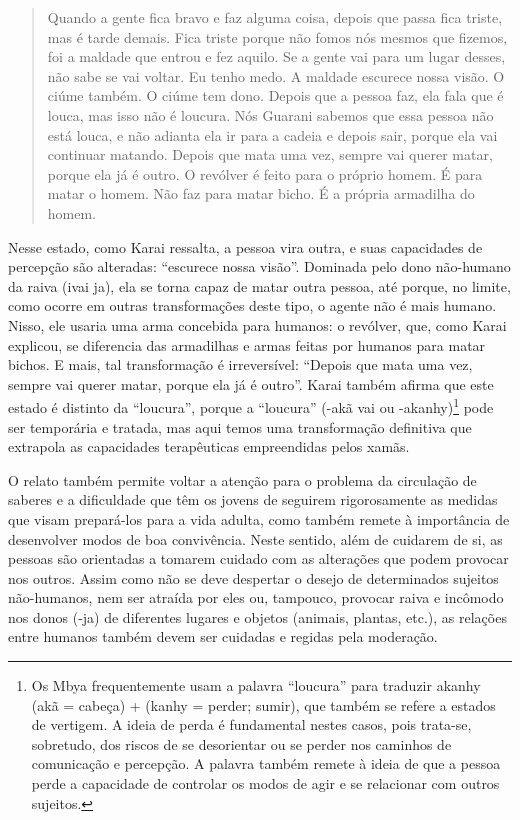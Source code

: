 \begin{quotation}
\noindent
Quando a gente fica bravo e faz alguma coisa, depois que passa fica
triste, mas é tarde demais. Fica triste porque não fomos nós mesmos que
fizemos, foi a maldade que entrou e fez aquilo. Se a gente vai para um
lugar desses, não sabe se vai voltar. Eu tenho medo. A maldade escurece
nossa visão. O ciúme também. O ciúme tem dono. Depois que a pessoa faz,
ela fala que é louca, mas isso não é loucura. Nós Guarani sabemos que
essa pessoa não está louca, e não adianta ela ir para a cadeia e depois
sair, porque ela vai continuar matando. Depois que mata uma vez, sempre
vai querer matar, porque ela já é outro. O revólver é feito para o
próprio homem. É para matar o homem. Não faz para matar bicho. É a
própria armadilha do homem.

\end{quotation}
Nesse estado, como Karai ressalta, a pessoa vira outra, e suas
capacidades de percepção são alteradas: ``escurece nossa visão''.
Dominada pelo dono não-humano da raiva (ivai ja), ela se torna capaz de
matar outra pessoa, até porque, no limite, como ocorre em outras
transformações deste tipo, o agente não é mais humano. Nisso, ele
usaria uma arma concebida para humanos: o revólver, que, como Karai
explicou, se diferencia das armadilhas e armas feitas por humanos para
matar bichos. E mais, tal transformação é irreversível: ``Depois que
mata uma vez, sempre vai querer matar, porque ela já é outro''. Karai
também afirma que este estado é distinto da ``loucura'', porque a
``loucura'' (-akã vai ou {}-akanhy)\footnote{Os Mbya frequentemente usam
a palavra ``loucura'' para traduzir akanhy (akã = cabeça) + (kanhy =
perder; sumir), que também se refere a estados de vertigem. A ideia de
perda é fundamental nestes casos, pois trata-se, sobretudo, dos riscos
de se desorientar ou se perder nos caminhos de comunicação e percepção.
A palavra também remete à ideia de que a pessoa perde a capacidade de
controlar os modos de agir e se relacionar com outros sujeitos.} pode
ser temporária e tratada, mas aqui temos uma transformação definitiva
que extrapola as capacidades terapêuticas empreendidas pelos xamãs. 

O relato também permite voltar a atenção para o problema da circulação
de saberes e a dificuldade que têm os jovens de seguirem rigorosamente
as medidas que visam prepará-los para a vida adulta, como também remete
à importância de desenvolver modos de boa convivência. Neste sentido,
além de cuidarem de si, as pessoas são orientadas a tomarem cuidado com
as alterações que podem provocar nos outros. Assim como não se deve
despertar o desejo de determinados sujeitos não-humanos, nem ser
atraída por eles ou, tampouco, provocar raiva e incômodo nos donos
(-ja) de diferentes lugares e objetos (animais, plantas, etc.), as
relações entre humanos também devem ser cuidadas e regidas pela
moderação. 

